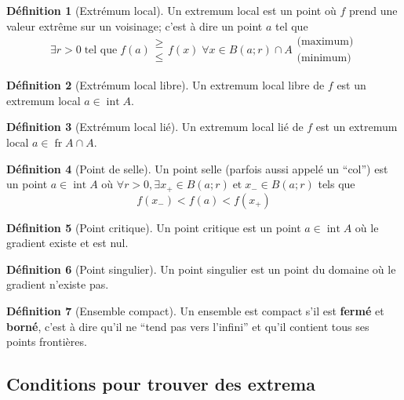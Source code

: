 \documentclass[11pt,a4paper]{article}
\theoremstyle{definition}
\newtheorem{mydef}{Définition}%
\DeclareMathOperator{\newint}{int}
\DeclareMathOperator{\newfr}{fr}
\begin{document}
\begin{mydef}[Extrémum local] Un extremum local est un point où $f$ prend une valeur extrême sur un voisinage; c'est à dire un point $a$ tel que
	\[ \exists r >0 \; \text{tel que} \; f(a) \begin{array}{l} \geq \\ \leq \end{array} f(x) \; \forall x \in B(a;r) \cap A \begin{array}{l} \text{(maximum)} \\ \text{(minimum)}
	\end{array} \]
\end{mydef}

\begin{mydef}[Extrémum local libre]
	Un extremum local libre de $f$ est un extremum local $a \in \newint A$.
\end{mydef}

\begin{mydef}[Extrémum local lié]
	Un extremum local lié de $f$ est un extremum local $a \in \newfr A \cap A$.
\end{mydef}

\begin{mydef}[Point de selle]
	Un point selle (parfois aussi appelé un ``col'') est un point $a \in \newint A$ où $\forall r > 0, \exists x_+ \in B(a;r) \; \text{et} \; x_- \in B(a;r)$ tels que
	\[ f(x_-) < f(a) < f(x_+) \]
\end{mydef}

\begin{mydef}[Point critique]
	Un point critique est un point $a \in \newint A$ où le gradient existe et est nul.
\end{mydef}

\begin{mydef}[Point singulier]
	Un point singulier est un point du domaine où le gradient n'existe pas.
\end{mydef}

\begin{mydef}[Ensemble compact]
	Un  ensemble est compact s'il est \textbf{fermé} et \textbf{borné},
	c'est à dire qu'il ne ``tend pas vers l'infini'' et qu'il contient tous ses points frontières.
\end{mydef}

\subsection{Conditions pour trouver des extrema}
\end{document}
